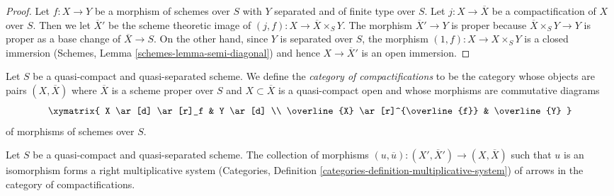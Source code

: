 \begin{proof}
Let $f : X \to Y$ be a morphism of schemes over $S$ with $Y$ separated
and of finite type over $S$. Let $j : X \to \overline{X}$ be a
compactification of $X$ over $S$. Then we let $\overline{X}'$ be
the scheme theoretic image of $(j, f) : X \to \overline{X} \times_S Y$.
The morphism $\overline{X}' \to Y$ is proper because
$\overline{X} \times_S Y \to Y$ is proper as a base change of
$\overline{X} \to S$. On the other hand, since $Y$ is separated
over $S$, the morphism $(1, f) : X \to X \times_S Y$ is a closed
immersion (Schemes, Lemma \ref{schemes-lemma-semi-diagonal})
and hence $X \to \overline{X}'$ is an open immersion.
\end{proof}

\noindent
Let $S$ be a quasi-compact and quasi-separated scheme.
We define the {\it category of compactifications} to be the category
whose objects are pairs $(X, \overline{X})$ where $\overline{X}$
is a scheme proper over $S$ and $X \subset \overline{X}$ is a
quasi-compact open and whose morphisms
are commutative diagrams
$$
\xymatrix{
X \ar[d] \ar[r]_f & Y \ar[d] \\
\overline{X} \ar[r]^{\overline{f}} & \overline{Y}
}
$$
of morphisms of schemes over $S$.

\begin{lemma}
\label{lemma-right-multiplicative-system}
Let $S$ be a quasi-compact and quasi-separated scheme.
The collection of morphisms
$(u, \overline{u}) : (X', \overline{X}') \to (X, \overline{X})$
such that $u$ is an isomorphism forms a right multiplicative system
(Categories, Definition \ref{categories-definition-multiplicative-system})
of arrows in the category of compactifications.
\end{lemma}

